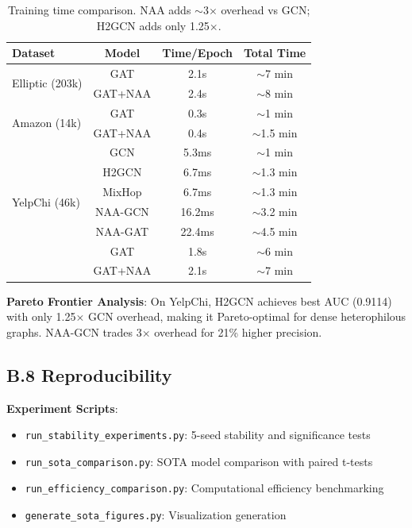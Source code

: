 \begin{table}[h]
\centering
\small
\begin{tabular}{lccc}
\toprule
\textbf{Dataset} & \textbf{Model} & \textbf{Time/Epoch} & \textbf{Total Time} \\
\midrule
\multirow{2}{*}{Elliptic (203k)} & GAT & 2.1s & $\sim$7 min \\
& GAT+NAA & 2.4s & $\sim$8 min \\
\midrule
\multirow{2}{*}{Amazon (14k)} & GAT & 0.3s & $\sim$1 min \\
& GAT+NAA & 0.4s & $\sim$1.5 min \\
\midrule
\multirow{6}{*}{YelpChi (46k)} & GCN & 5.3ms & $\sim$1 min \\
& H2GCN & 6.7ms & $\sim$1.3 min \\
& MixHop & 6.7ms & $\sim$1.3 min \\
& NAA-GCN & 16.2ms & $\sim$3.2 min \\
& NAA-GAT & 22.4ms & $\sim$4.5 min \\
\midrule
\multirow{2}{*}{DGraphFin (208k)} & GAT & 1.8s & $\sim$6 min \\
& GAT+NAA & 2.1s & $\sim$7 min \\
\bottomrule
\end{tabular}
\caption{Training time comparison. NAA adds $\sim$3$\times$ overhead vs GCN; H2GCN adds only 1.25$\times$.}
\end{table}

\textbf{Pareto Frontier Analysis}: On YelpChi, H2GCN achieves best AUC (0.9114) with only 1.25$\times$ GCN overhead, making it Pareto-optimal for dense heterophilous graphs. NAA-GCN trades 3$\times$ overhead for 21\% higher precision.

\subsection*{B.8 Reproducibility}

\textbf{Experiment Scripts}:
\begin{itemize}
\item \texttt{run\_stability\_experiments.py}: 5-seed stability and significance tests
\item \texttt{run\_sota\_comparison.py}: SOTA model comparison with paired t-tests
\item \texttt{run\_efficiency\_comparison.py}: Computational efficiency benchmarking
\item \texttt{generate\_sota\_figures.py}: Visualization generation
\end{itemize}

